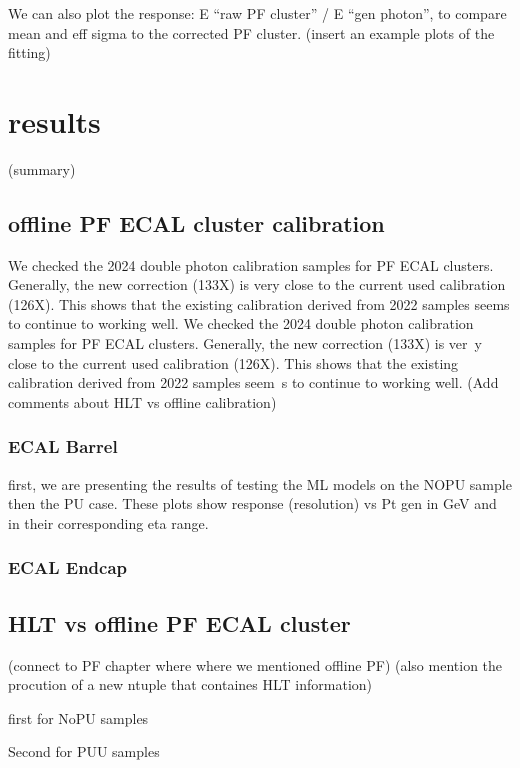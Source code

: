 We can also plot the response: E “raw PF cluster” / E “gen photon”, to compare mean and eff sigma to the corrected PF cluster. (insert an example plots of the fitting)
\section{results}
(summary)

\subsection{offline PF ECAL cluster calibration}
We checked the 2024 double photon calibration samples for PF ECAL clusters. Generally, the new correction (133X) is very close to the current used calibration (126X).
This shows that the existing calibration derived from 2022 samples seems to continue to working well.
We checked the 2024 double photon calibration samples for PF ECAL clusters. Generally, the new correction (133X) is ver\
y close to the current used calibration (126X). This shows that the existing calibration derived from 2022 samples seem\
s to continue to working well. (Add comments about HLT vs offline calibration)

\subsubsection{ECAL Barrel}
first, we are presenting the results of testing the ML models on the NOPU sample then the PU case.
These plots show response (resolution) vs Pt gen in GeV and in their corresponding eta range.





\subsubsection{ECAL Endcap}






\subsection{HLT vs offline PF ECAL cluster}

(connect to PF chapter where where we mentioned offline PF)
(also mention the procution of a new ntuple that containes HLT information)

first for NoPU samples

Second for PUU samples

